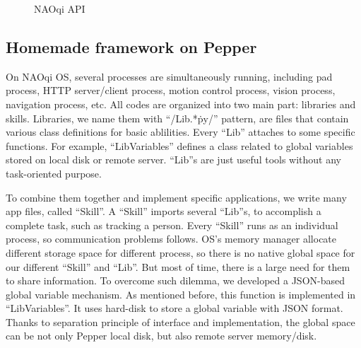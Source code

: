 \begin{figure}[!h]
    \centering
    \hspace{0.2in}
    \caption{NAOqi API}
    \label{fig:naoqi}
\end{figure}

\subsection{Homemade framework on Pepper}
\label{subsec:native}

On NAOqi OS, several processes are simultaneously running, including pad process, HTTP server/client process, motion control process, vision process, navigation process, etc.
All codes are organized into two main part: libraries and skills. 
Libraries, we name them with “/Lib.*\.py/” pattern, are files that contain various class definitions for basic ablilities. 
Every “Lib” attaches to some specific functions. 
For example, “LibVariables” defines a class related to global variables stored on local disk or remote server. 
“Lib”s are just useful tools without any task-oriented purpose. 

To combine them together and implement specific applications, we write many app files, called “Skill”. 
A “Skill” imports several “Lib”s, to accomplish a complete task, such as tracking a person. 
Every “Skill” runs as an individual process, so communication problems follows. 
OS’s memory manager allocate different storage space for different process, so there is no native global space for our different “Skill” and “Lib”. 
But most of time, there is a large need for them to share information. 
To overcome such dilemma, we developed a JSON-based global variable mechanism. As mentioned before, this function is implemented in “LibVariables”. 
It uses hard-disk to store a global variable with JSON format. 
Thanks to separation principle of interface and implementation, the global space can be not only Pepper local disk, but also remote server memory/disk. 


